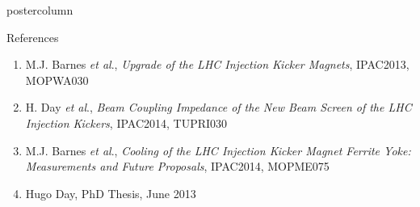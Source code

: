 \documentclass[final,hyperref={pdfpagelabels=false}]{beamer}
\begin{document}
\begin{frame}
\begin{columns}
\begin{column}{.49\textwidth}
\begin{beamercolorbox}[center,wd=\textwidth]{postercolumn}
\begin{minipage}[T]{.95\textwidth}
{\vfill
\begin{block}{References}
\begin{enumerate}
\item{\small{M.J. Barnes \emph{et al}., \emph{Upgrade of the LHC Injection Kicker Magnets}, IPAC2013, MOPWA030}}
\item{\small{H. Day \emph{et al}., \emph{Beam Coupling Impedance of the New Beam Screen of the LHC Injection Kickers}, IPAC2014, TUPRI030}}
\item{\small{M.J. Barnes \emph{et al}., \emph{Cooling of the LHC Injection Kicker Magnet Ferrite Yoke: Measurements and Future Proposals}, IPAC2014, MOPME075}}
\item{\small{Hugo Day, PhD Thesis, June 2013}}
\end{enumerate}
\end{block}
         \vfill
          }
        \end{minipage}
      \end{beamercolorbox}
    \end{column}


\end{columns}
\end{frame}
\end{document}
